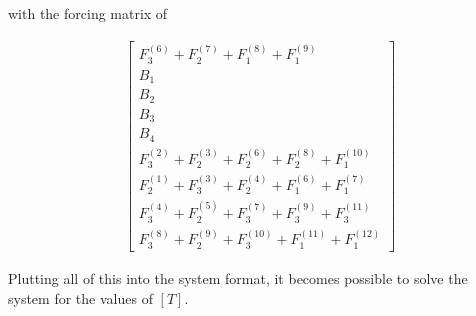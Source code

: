 \documentclass[9pt]{amsart}
\begin{document}
with the forcing matrix of

\begin{align*}
  \begin{bmatrix}
    F_3^{(6)}+F_2^{(7)}+F_1^{(8)}+F_1^{(9)}\\
    B_1\\
    B_2\\
    B_3\\
    B_4\\
    F_3^{(2)}+F_2^{(3)}+F_2^{(6)}+F_2^{(8)}+F_1^{(10)}\\
    F_2^{(1)}+F_3^{(3)}+F_2^{(4)}+F_1^{(6)}+F_1^{(7)}\\
    F_3^{(4)}+F_2^{(5)}+F_3^{(7)}+F_3^{(9)}+F_3^{(11)}\\
    F_3^{(8)}+F_2^{(9)}+F_3^{(10)}+F_1^{(11)}+F_1^{(12)}
  \end{bmatrix}
\end{align*}

Plutting all of this into the system format, it becomes possible to solve the
system for the values of $[T]$.
\end{document}
